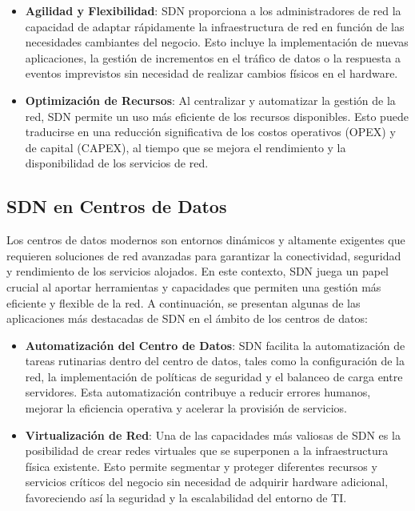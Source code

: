 {            \begin{itemize}
                \item \textbf{Agilidad y Flexibilidad}: SDN proporciona a los administradores de red la capacidad de adaptar rápidamente la infraestructura de red en función de las necesidades cambiantes del negocio. Esto incluye la implementación de nuevas aplicaciones, la gestión de incrementos en el tráfico de datos o la respuesta a eventos imprevistos sin necesidad de realizar cambios físicos en el hardware.
                \item \textbf{Optimización de Recursos}: Al centralizar y automatizar la gestión de la red, SDN permite un uso más eficiente de los recursos disponibles. Esto puede traducirse en una reducción significativa de los costos operativos (OPEX) y de capital (CAPEX), al tiempo que se mejora el rendimiento y la disponibilidad de los servicios de red.
            \end{itemize}
        
        \subsection{SDN en Centros de Datos}
            Los centros de datos modernos son entornos dinámicos y altamente exigentes que requieren soluciones de red avanzadas para garantizar la conectividad, seguridad y rendimiento de los servicios alojados. En este contexto, SDN juega un papel crucial al aportar herramientas y capacidades que permiten una gestión más eficiente y flexible de la red. A continuación, se presentan algunas de las aplicaciones más destacadas de SDN en el ámbito de los centros de datos:

            \begin{itemize}
                \item \textbf{Automatización del Centro de Datos}: SDN facilita la automatización de tareas rutinarias dentro del centro de datos, tales como la configuración de la red, la implementación de políticas de seguridad y el balanceo de carga entre servidores. Esta automatización contribuye a reducir errores humanos, mejorar la eficiencia operativa y acelerar la provisión de servicios.
                \item \textbf{Virtualización de Red}: Una de las capacidades más valiosas de SDN es la posibilidad de crear redes virtuales que se superponen a la infraestructura física existente. Esto permite segmentar y proteger diferentes recursos y servicios críticos del negocio sin necesidad de adquirir hardware adicional, favoreciendo así la seguridad y la escalabilidad del entorno de TI.
            \end{itemize}

}

